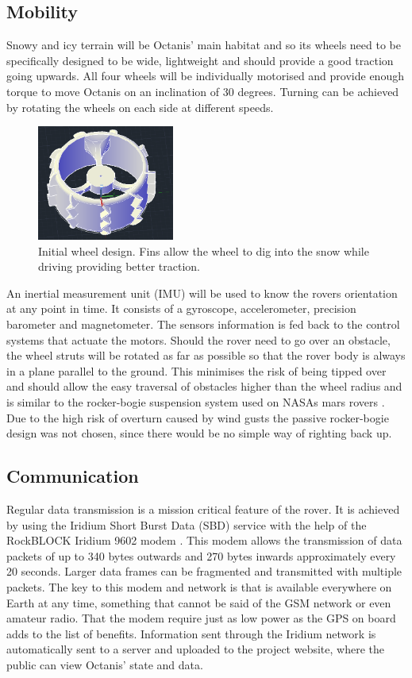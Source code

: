\documentclass[a4paper,12pt]{article}
\begin{document}
\subsection{Mobility}
Snowy and icy terrain will be Octanis' main habitat and so its wheels need to be specifically designed to be wide, lightweight and should provide a good traction going upwards. 
All four wheels will be individually motorised and provide enough torque to move Octanis on an inclination of 30 degrees. Turning can be achieved by rotating the wheels on each side at different speeds. 

\begin{figure}[h!]
	\centering
    \includegraphics[width=0.4\textwidth]{wheel}
    \caption{Initial wheel design. Fins allow the wheel to dig into the snow while driving providing better traction.}
\end{figure}


An inertial measurement unit (IMU) will be used to know the rovers orientation at any point in time. It consists of a gyroscope, accelerometer, precision barometer and magnetometer. The sensors information is fed back to the control systems that actuate the motors. Should the rover need to go over an obstacle, the wheel struts will be rotated as far as possible so that the rover body is always in a plane parallel to the ground. This minimises the risk of being tipped over and should allow the easy traversal of obstacles higher than the wheel radius and is similar to the rocker-bogie suspension system used on NASAs mars rovers \cite{rockerbogie}. Due to the high risk of overturn caused by wind gusts the passive rocker-bogie design was not chosen, since there would be no simple way of righting back up.


\subsection{Communication}
Regular data transmission is a mission critical feature of the rover. It is achieved by using the Iridium Short Burst Data (SBD) service with the help of the RockBLOCK Iridium 9602 modem \cite{iridium}. This modem allows the transmission of data packets of up to 340 bytes outwards and 270 bytes inwards approximately every 20 seconds. Larger data frames can be fragmented and transmitted with multiple packets. The key to this modem and network is that is available everywhere on Earth at any time, something that cannot be said of the GSM network or even amateur radio. That the modem require just as low power as the GPS on board adds to the list of benefits. Information sent through the Iridium network is automatically sent to a server and uploaded to the project website, where the public can view Octanis' state and data.
\end{document}
